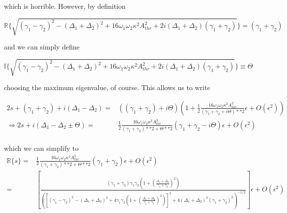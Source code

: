 which is horrible. However, by definition 

\begin{equation}
\mathbb{R}\{\sqrt{ (\gamma_1-\gamma_2)^2 - (\Delta_1+\Delta_2)^2 + 16\omega_1\omega_2\kappa^2 A_{thr}^2 +  2i(\Delta_1+\Delta_2)(\gamma_1+\gamma_2) } \} = (\gamma_1+\gamma_2)
\end{equation}

and we can simply define

\begin{equation}
\mathbb{I}\{\sqrt{ (\gamma_1-\gamma_2)^2 - (\Delta_1+\Delta_2)^2 + 16\omega_1\omega_2\kappa^2 A_{thr}^2 +  2i(\Delta_1+\Delta_2)(\gamma_1+\gamma_2) } \} \equiv \Theta
\end{equation}

choosing the maximum eigenvalue, of course. This allows us to write

\begin{subequations}
\begin{align}
2s +(\gamma_1+\gamma_2)+i(\Delta_1-\Delta_2) = &  ( (\gamma_1+\gamma_2) + i\Theta ) \left( 1 + \frac{1}{2}\frac{16\omega_1\omega_2\kappa^2 A_{thr}^2}{(\gamma_1+\gamma_2 + i\Theta)**2} \epsilon + O(\epsilon^2) \right)\\
\Rightarrow 2s + i(\Delta_1-\Delta_2 \pm \Theta) = &  \frac{1}{2}\frac{16\omega_1\omega_2\kappa^2 A_{thr}^2}{(\gamma_1+\gamma_2)**2 + \Theta**2} (\gamma_1+\gamma_2-i\Theta) \epsilon + O(\epsilon^2) \\
\end{align}
\end{subequations}

which we can simplify to
\begin{subequations}
\begin{align}
\mathbb{R}\{s\} = & \frac{1}{2}\frac{16\omega_1\omega_2\kappa^2 A_{thr}^2}{(\gamma_1+\gamma_2)**2 + \Theta**2} (\gamma_1+\gamma_2) \epsilon + O(\epsilon^2) \\
                = & \left[\frac{(\gamma_1+\gamma_2)\gamma_1\gamma_2 \left( 1 + \left(\frac{\Delta_1+\Delta_2}{\gamma_1+\gamma_2}\right)^2\right)}{ \left( \left[(\gamma_1-\gamma_2)^2 - (\Delta_1+\Delta_2)^2 + 4\gamma_1\gamma_2\left( 1 + \left(\frac{\Delta_1+\Delta_2}{\gamma_1+\gamma_2}\right)^2\right) \right]^2 + 4(\Delta_1+\Delta_2)^2(\gamma_1+\gamma_2)^2\right)^{-1/2} }\right] \epsilon + O(\epsilon^2) \\
\end{align}
\end{subequations}

